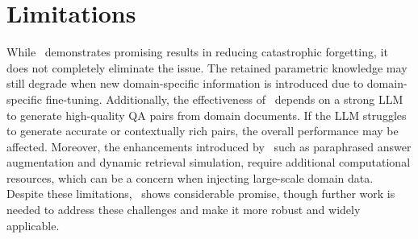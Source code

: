 \section{Limitations} While \ourmethodshort\ demonstrates promising results in reducing catastrophic forgetting, it does not completely eliminate the issue. The retained parametric knowledge may still degrade when new domain-specific information is introduced due to domain-specific fine-tuning. Additionally, the effectiveness of \ourmethodshort\ depends on a strong LLM to generate high-quality QA pairs from domain documents. If the LLM struggles to generate accurate or contextually rich pairs, the overall performance may be affected. Moreover, the enhancements introduced by \ourmethodshort\, such as paraphrased answer augmentation and dynamic retrieval simulation, require additional computational resources, which can be a concern when injecting large-scale domain data. Despite these limitations, \ourmethodshort\ shows considerable promise, though further work is needed to address these challenges and make it more robust and widely applicable.